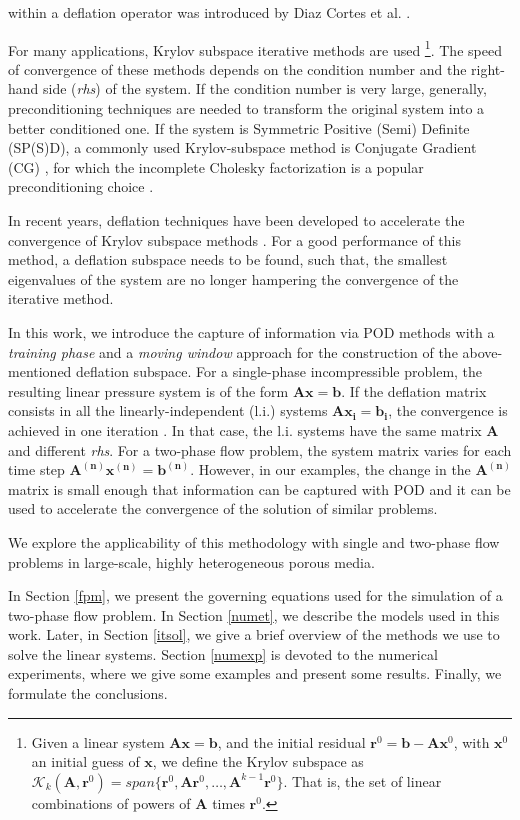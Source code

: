 \documentclass[12pt]{article}
\begin{document}
within a deflation operator was introduced by Diaz Cortes et al. \cite{Diaz17}.\par
For many applications, Krylov subspace iterative
methods are used \cite{Saad03,vanderVorst03}\footnote{Given a linear system $\mathbf{A}\mathbf{x}=\mathbf{b}$, and the initial 
residual $\mathbf{r}^0=\mathbf{b}-\mathbf{A}\mathbf{x}^0$, with $\mathbf{x}^0$ an initial guess of $\mathbf{x}$, we define the Krylov subspace as
$\mathcal{K}_k(\mathbf{A},\mathbf{r}^0)=span\{\mathbf{r}^0,\mathbf{A}\mathbf{r}^0,\dots,\mathbf{A}^{k-1}\mathbf{r}^0\}$. 
That is, the set of linear combinations of powers of $\mathbf{A}$ times $\mathbf{r}^0$. }. The speed of convergence of these 
methods depends on the condition number and the right-hand side (\emph{rhs}) of the system. If the condition 
number is very large, generally, preconditioning techniques are needed to transform the original system into a 
better conditioned one. If the system is Symmetric Positive (Semi) Definite (SP(S)D), a commonly used Krylov-subspace method is 
Conjugate Gradient (CG) \cite{vanderVorst88,Vuik99,Vuik02,Tang09,Carlberg15}, for which the incomplete Cholesky factorization is a popular preconditioning 
choice \cite{vanderVorst88,Benzi02}.\par In recent years, deflation techniques have been developed to accelerate the convergence of
Krylov subspace methods \cite{Vuik99,Vuik02,Tang07,Tang08,Tang09}. For a good performance of this 
method, a deflation subspace needs to be found, such that, the smallest eigenvalues of the 
system are no longer hampering the convergence of the iterative method. \par
In this work, we introduce the capture of information via POD methods with a \emph{training phase} and a \emph{moving window} 
approach for the construction of the above-mentioned deflation subspace. For a single-phase incompressible problem, the resulting 
linear pressure system is of the form $\mathbf{A}\mathbf{x} =\mathbf{b}$. If the deflation matrix consists in all the 
linearly-independent (l.i.) systems $\mathbf{A}\mathbf{x_i} =\mathbf{b_i}$, the convergence is achieved in one iteration 
\cite{Diaz17,Diaz17_TU}. In that case, the l.i. systems have the same matrix $\mathbf{A}$ and different \emph{rhs}. 
For a two-phase flow problem, the system matrix varies for each time step $\mathbf{A^{(n)}}\mathbf{x^{(n)}} =\mathbf{b^{(n)}}$. 
However, in our examples, the change in the $\mathbf{A^{(n)}}$ matrix is small enough that information can be captured with POD 
and it can be used to accelerate the convergence of the solution of similar problems. \par
We explore the applicability of this methodology with single and two-phase flow problems in large-scale, highly heterogeneous 
porous media. \par
In Section \ref{fpm}, we present the governing equations used for the simulation of a two-phase flow problem. In Section \ref{numet}, we describe the models used in this work. Later, in 
Section \ref{itsol}, we give a brief overview of the methods we use to solve the linear systems. 
Section \ref{numexp} is devoted to the numerical experiments, where we give some examples and 
present some results. Finally, we formulate the conclusions.\par
\end{document}
